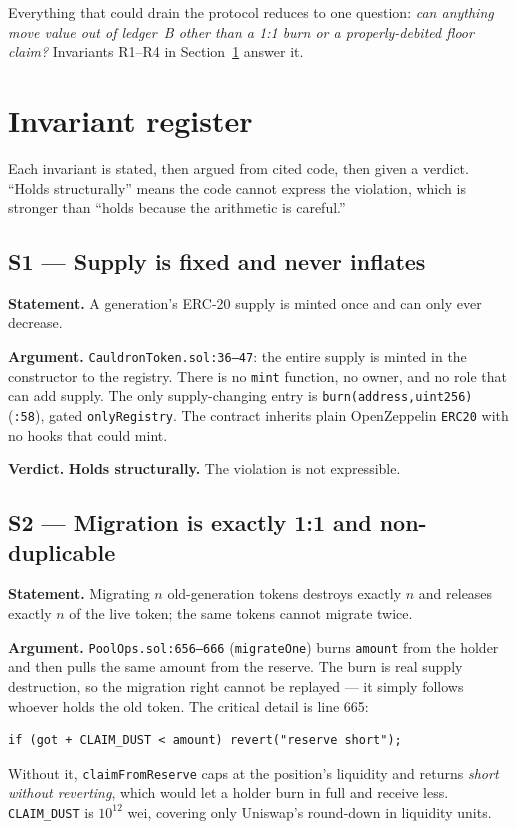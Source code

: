 \documentclass[11pt,a4paper]{article}
\newcommand{\code}[1]{\texttt{\small #1}}
\newcommand{\fileref}[1]{\texttt{\scriptsize #1}}
\begin{document}
Everything that could drain the protocol reduces to one question: \emph{can
anything move value out of ledger~B other than a 1:1 burn or a properly-debited
floor claim?} Invariants R1--R4 in Section~\ref{sec:invariants} answer it.

\newpage
\section{Invariant register}
\label{sec:invariants}

Each invariant is stated, then argued from cited code, then given a verdict.
``Holds structurally'' means the code cannot express the violation, which is
stronger than ``holds because the arithmetic is careful.''

\subsection*{S1 --- Supply is fixed and never inflates}
\textbf{Statement.} A generation's ERC-20 supply is minted once and can only ever
decrease.

\textbf{Argument.} \fileref{CauldronToken.sol:36--47}: the entire supply is minted
in the constructor to the registry. There is no \code{mint} function, no owner,
and no role that can add supply. The only supply-changing entry is
\code{burn(address,uint256)} (\fileref{:58}), gated \code{onlyRegistry}. The
contract inherits plain OpenZeppelin \code{ERC20} with no hooks that could mint.

\textbf{Verdict.} \textcolor{good}{\textbf{Holds structurally.}} The violation is
not expressible.

\subsection*{S2 --- Migration is exactly 1:1 and non-duplicable}
\textbf{Statement.} Migrating $n$ old-generation tokens destroys exactly $n$ and
releases exactly $n$ of the live token; the same tokens cannot migrate twice.

\textbf{Argument.} \fileref{PoolOps.sol:656--666} (\code{migrateOne}) burns
\code{amount} from the holder and then pulls the same amount from the reserve. The
burn is real supply destruction, so the migration right cannot be replayed --- it
simply follows whoever holds the old token. The critical detail is line 665:
\begin{lstlisting}
if (got + CLAIM_DUST < amount) revert("reserve short");
\end{lstlisting}
Without it, \code{claimFromReserve} caps at the position's liquidity and returns
\emph{short without reverting}, which would let a holder burn in full and receive
less. \code{CLAIM\_DUST} is $10^{12}$ wei, covering only Uniswap's
round-down in liquidity units.
\end{document}
